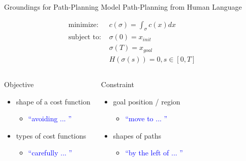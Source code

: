 \begin{frame}{Groundings for Path-Planning}{ Model Path-Planning from Human Language } 

\begin{eqnarray}
\nonumber
\mbox{minimize: } & c(\sigma) = \int_{ \sigma } c(x) dx \\
\nonumber
\mbox{subject to: } & \sigma(0) = x_{init} \\
\nonumber
& \sigma(T) = x_{goal} \\
\nonumber
& H( \sigma(s) ) = 0 , s \in [0, T] 
\end{eqnarray}

\begin{columns}
\begin{block}{Objective}
\begin{itemize}
\item shape of a cost function
\begin{itemize}
\item \textcolor{blue}{``avoiding ... ''}
\end{itemize}
\item types of cost functions
\begin{itemize}
\item \textcolor{blue}{``carefully ... ''}
\end{itemize}
\end{itemize}
\end{block}
\begin{block}{Constraint}
\begin{itemize}
\item goal position / region
\begin{itemize}
\item \textcolor{blue}{``move to ... ''}
\end{itemize}
\item shapes of paths
\begin{itemize}
\item \textcolor{blue}{``by the left of ... ''}
\end{itemize}
\end{itemize}
\end{block}
\end{columns}

\end{frame}

